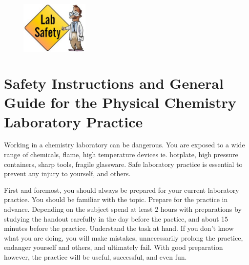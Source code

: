\begin{figure}
  \centering
  \includegraphics[width=0.3\textwidth]{fig/labsafety.jpg}
\end{figure}

\section*{Safety Instructions and General Guide for the Physical Chemistry Laboratory Practice}


Working in a chemistry laboratory can be dangerous. You are exposed to a wide range of chemicals, flame, high temperature devices ie. hotplate, high pressure containers, sharp tools, fragile glassware. Safe laboratory practice is essential to prevent any injury to yourself, and others.

First and foremost, you should always be prepared for your current laboratory practice. You should be familiar with the topic. Prepare for the practice in advance. Depending on the subject spend at least 2 hours with preparations by studying the handout carefully in the day before the pactice, and about 15 minutes before the practice. Understand the task at hand. If you don't know what you are doing, you will make mistakes, unnecessarily prolong the practice, endanger yourself and others, and ultimately fail. With good preparation however, the practice will be useful, successful, and even fun.

